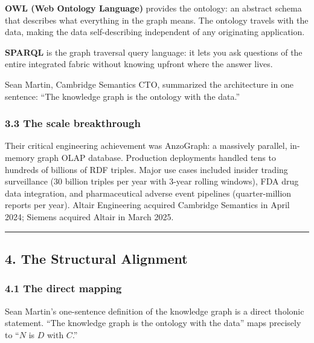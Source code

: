 \documentclass[
  11pt,
  letterpaper,
]{article}
\begin{document}
\textbf{OWL (Web Ontology Language)} provides the ontology: an abstract
schema that describes what everything in the graph means. The ontology
travels with the data, making the data self-describing independent of
any originating application.

\textbf{SPARQL} is the graph traversal query language: it lets you ask
questions of the entire integrated fabric without knowing upfront where
the answer lives.

Sean Martin, Cambridge Semantics CTO, summarized the architecture in one
sentence: ``The knowledge graph is the ontology with the data.''

\subsubsection{3.3 The scale breakthrough}\label{the-scale-breakthrough}

Their critical engineering achievement was AnzoGraph: a massively
parallel, in-memory graph OLAP database. Production deployments handled
tens to hundreds of billions of RDF triples. Major use cases included
insider trading surveillance (30 billion triples per year with 3-year
rolling windows), FDA drug data integration, and pharmaceutical adverse
event pipelines (quarter-million reports per year). Altair Engineering
acquired Cambridge Semantics in April 2024; Siemens acquired Altair in
March 2025.

\begin{center}\rule{0.5\linewidth}{0.5pt}\end{center}

\subsection{4. The Structural Alignment}\label{the-structural-alignment}

\subsubsection{4.1 The direct mapping}\label{the-direct-mapping}

Sean Martin's one-sentence definition of the knowledge graph is a direct
tholonic statement. ``The knowledge graph is the ontology with the
data'' maps precisely to ``\(N\) is \(D\) with \(C\).''
\end{document}
